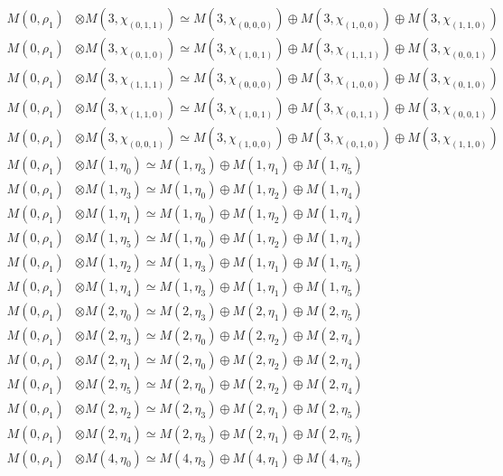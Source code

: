 \begin{align*}
M(0,\rho_{1}) &\otimes M(3,\chi_{(0,1,1)}) \simeq M(3,\chi_{(0,0,0)}) \oplus M(3,\chi_{(1,0,0)}) \oplus M(3,\chi_{(1,1,0)})\\
M(0,\rho_{1}) &\otimes M(3,\chi_{(0,1,0)}) \simeq M(3,\chi_{(1,0,1)}) \oplus M(3,\chi_{(1,1,1)}) \oplus M(3,\chi_{(0,0,1)})\\
M(0,\rho_{1}) &\otimes M(3,\chi_{(1,1,1)}) \simeq M(3,\chi_{(0,0,0)}) \oplus M(3,\chi_{(1,0,0)}) \oplus M(3,\chi_{(0,1,0)})\\
M(0,\rho_{1}) &\otimes M(3,\chi_{(1,1,0)}) \simeq M(3,\chi_{(1,0,1)}) \oplus M(3,\chi_{(0,1,1)}) \oplus M(3,\chi_{(0,0,1)})\\
M(0,\rho_{1}) &\otimes M(3,\chi_{(0,0,1)}) \simeq M(3,\chi_{(1,0,0)}) \oplus M(3,\chi_{(0,1,0)}) \oplus M(3,\chi_{(1,1,0)})\\
M(0,\rho_{1}) &\otimes M(1,\eta_{0}) \simeq M(1,\eta_{3}) \oplus M(1,\eta_{1}) \oplus M(1,\eta_{5})\\
M(0,\rho_{1}) &\otimes M(1,\eta_{3}) \simeq M(1,\eta_{0}) \oplus M(1,\eta_{2}) \oplus M(1,\eta_{4})\\
M(0,\rho_{1}) &\otimes M(1,\eta_{1}) \simeq M(1,\eta_{0}) \oplus M(1,\eta_{2}) \oplus M(1,\eta_{4})\\
M(0,\rho_{1}) &\otimes M(1,\eta_{5}) \simeq M(1,\eta_{0}) \oplus M(1,\eta_{2}) \oplus M(1,\eta_{4})\\
M(0,\rho_{1}) &\otimes M(1,\eta_{2}) \simeq M(1,\eta_{3}) \oplus M(1,\eta_{1}) \oplus M(1,\eta_{5})\\
M(0,\rho_{1}) &\otimes M(1,\eta_{4}) \simeq M(1,\eta_{3}) \oplus M(1,\eta_{1}) \oplus M(1,\eta_{5})\\
M(0,\rho_{1}) &\otimes M(2,\eta_{0}) \simeq M(2,\eta_{3}) \oplus M(2,\eta_{1}) \oplus M(2,\eta_{5})\\
M(0,\rho_{1}) &\otimes M(2,\eta_{3}) \simeq M(2,\eta_{0}) \oplus M(2,\eta_{2}) \oplus M(2,\eta_{4})\\
M(0,\rho_{1}) &\otimes M(2,\eta_{1}) \simeq M(2,\eta_{0}) \oplus M(2,\eta_{2}) \oplus M(2,\eta_{4})\\
M(0,\rho_{1}) &\otimes M(2,\eta_{5}) \simeq M(2,\eta_{0}) \oplus M(2,\eta_{2}) \oplus M(2,\eta_{4})\\
M(0,\rho_{1}) &\otimes M(2,\eta_{2}) \simeq M(2,\eta_{3}) \oplus M(2,\eta_{1}) \oplus M(2,\eta_{5})\\
M(0,\rho_{1}) &\otimes M(2,\eta_{4}) \simeq M(2,\eta_{3}) \oplus M(2,\eta_{1}) \oplus M(2,\eta_{5})\\
M(0,\rho_{1}) &\otimes M(4,\eta_{0}) \simeq M(4,\eta_{3}) \oplus M(4,\eta_{1}) \oplus M(4,\eta_{5})\\

\end{align*}
